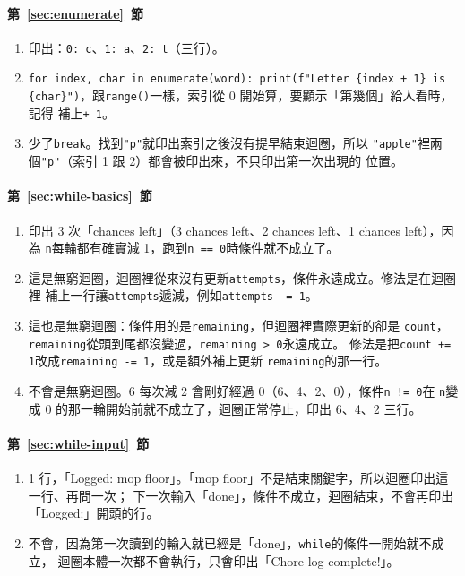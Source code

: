 \paragraph{第~\ref{sec:enumerate}~節}
\begin{enumerate}
\item 印出：\texttt{0: c}、\texttt{1: a}、\texttt{2: t}（三行）。
\item \texttt{for index, char in enumerate(word): print(f"Letter \{index + 1\} is
\{char\}")}，跟\texttt{range()}一樣，索引從 0 開始算，要顯示「第幾個」給人看時，記得
補上\texttt{+ 1}。
\item 少了\texttt{break}。找到\texttt{"p"}就印出索引之後沒有提早結束迴圈，所以
\texttt{"apple"}裡兩個\texttt{"p"}（索引 1 跟 2）都會被印出來，不只印出第一次出現的
位置。
\end{enumerate}

\paragraph{第~\ref{sec:while-basics}~節}
\begin{enumerate}
\item 印出 3 次「chances left」（3 chances left、2 chances left、1 chances left），因為
\texttt{n}每輪都有確實減 1，跑到\texttt{n == 0}時條件就不成立了。
\item 這是無窮迴圈，迴圈裡從來沒有更新\texttt{attempts}，條件永遠成立。修法是在迴圈裡
補上一行讓\texttt{attempts}遞減，例如\texttt{attempts -= 1}。
\item 這也是無窮迴圈：條件用的是\texttt{remaining}，但迴圈裡實際更新的卻是
\texttt{count}，\texttt{remaining}從頭到尾都沒變過，\texttt{remaining > 0}永遠成立。
修法是把\texttt{count += 1}改成\texttt{remaining -= 1}，或是額外補上更新
\texttt{remaining}的那一行。
\item 不會是無窮迴圈。6 每次減 2 會剛好經過 0（6、4、2、0），條件\texttt{n != 0}在
\texttt{n}變成 0 的那一輪開始前就不成立了，迴圈正常停止，印出 6、4、2 三行。
\end{enumerate}

\paragraph{第~\ref{sec:while-input}~節}
\begin{enumerate}
\item 1 行，「Logged: mop floor」。「mop floor」不是結束關鍵字，所以迴圈印出這一行、再問一次；
下一次輸入「done」，條件不成立，迴圈結束，不會再印出「Logged:」開頭的行。
\item 不會，因為第一次讀到的輸入就已經是「done」，\texttt{while}的條件一開始就不成立，
迴圈本體一次都不會執行，只會印出「Chore log complete!」。
\end{enumerate}

